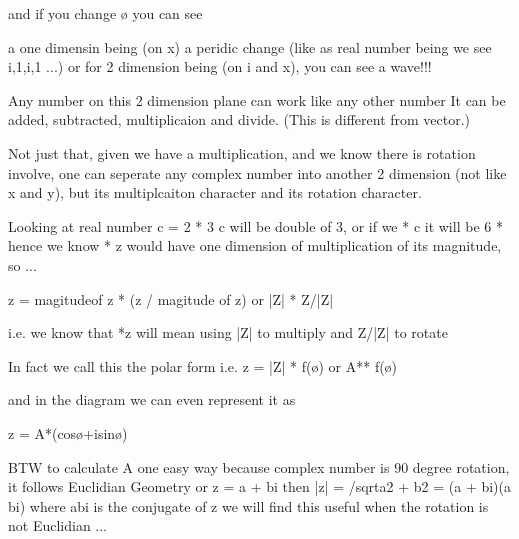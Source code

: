 \documentclass[letterpaper,10pt,english]{jupyterBook}
\begin{document}
\begin{sphinxVerbatim}[commandchars=\\\{\}]
and if you change ø you can see 

\PYGZhy{} a one dimensin being (on x) a peridic change (like as real number being we see i,\PYGZhy{}1,\PYGZhy{}i,1 ...)
\PYGZhy{} or for 2 dimension being (on i and x), you can see a wave!!!
\end{sphinxVerbatim}

\begin{sphinxVerbatim}[commandchars=\\\{\}]
Any number on this 2 dimension plane can work like any other number
It can be added, subtracted, multiplicaion and divide.  (This is different from vector.)

Not just that, given we have a multiplication, and we know there is rotation involve, 
one can seperate any complex number into another 2 dimension (not like x and y), 
but its multiplcaiton character and its rotation character.

Looking at real number
c = 2 * 3 
c will be double of 3, 
or if we * c it will be 6 *
hence we know * z would have one dimension of multiplication of its magnitude, so ...

z = magitudeof z * (z / magitude of z) 
or |Z| * Z/|Z| 

i.e. we know that 
*z will mean using |Z| to multiply and Z/|Z| to rotate

In fact we call this the polar form i.e. z = |Z| * f(ø) or A** f(ø)

\PYGZhy{}\PYGZhy{}\PYGZgt{} and in the diagram we can even represent it as

z = A*(cosø+isinø)

BTW to calculate A one easy way because complex number is 90 degree rotation,
    it follows Euclidian Geometry or
    z = a + bi then |z| = /sqrt\PYGZob{}a\PYGZca{}2 + b\PYGZca{}2\PYGZcb{} 
      = (a + bi)(a \PYGZhy{} bi) where a\PYGZhy{}bi is the conjugate of z
    we will find this useful when the rotation is not Euclidian ...
\end{sphinxVerbatim}
\end{document}
